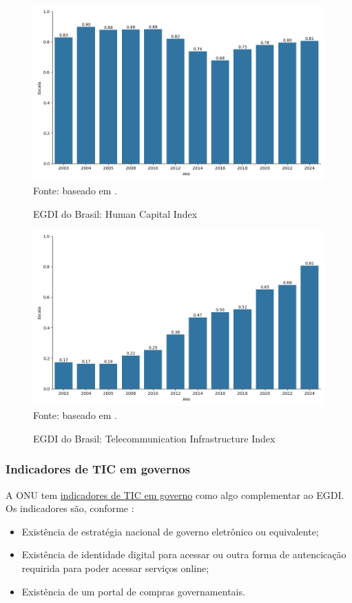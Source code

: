 \begin{figure}[H]
    \centering
    \caption{EGDI do Brasil: Human Capital Index}
    \includegraphics[width=1\linewidth]{figuras/egdi/egdi_brasil_hci.png}
    \label{fig:egdi_brasil_hci}
    \footnotesize{Fonte: baseado em \cite{ONU_edgi_mapa}.}
\end{figure}

\begin{figure}[H]
    \centering
    \caption{EGDI do Brasil: Telecommunication Infrastructure Index}
    \includegraphics[width=1\linewidth]{figuras/egdi/egdi_brasil_tsi.png}
    \label{fig:egdi_brasil_tsi}
    \footnotesize{Fonte: baseado em \cite{ONU_edgi_mapa}.}
\end{figure}

\subsubsection{Indicadores de TIC em governos}

A ONU tem \href{https://publicadministration.un.org/egovkb/en-us/Data/ICT-in-government}{indicadores de TIC em governo} como algo complementar ao EGDI. Os indicadores são, conforme \cite{ONU_ICT_in_government_indicators}:

\begin{itemize}
    \item Existência de estratégia nacional de governo eletrônico ou equivalente;
    \item Existência de identidade digital para acessar ou outra forma de autencicação requirida para poder acessar serviços online;
    \item Existência de um portal de compras governamentais.
\end{itemize}